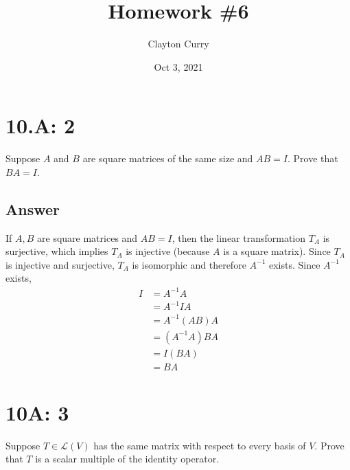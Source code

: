 \documentclass[
	12pt, %
]{fphw}
\title{Homework \#6} %
\author{Clayton Curry} %
\date{Oct 3, 2021} %
\institute{University of Oklahoma \\ Department of Mathematics} %
\newcommand\0{\mathbf{0}}
\renewcommand\L[1]{\mathcal{L}(#1)}
\begin{document}
\maketitle %


\section*{10.A: 2}
\begin{problem}
Suppose $A$ and $B$ are square matrices of the same size and $AB=I$. Prove that $BA=I$.
\end{problem}


\subsection*{Answer}
If $A,B$ are square matrices and $AB = I$, then the linear transformation $T_A$ is surjective, which implies $T_A$ is injective (because $A$ is a square matrix). Since $T_A$ is injective and surjective, $T_A$ is isomorphic and therefore $A^{-1}$ exists. Since $A^{-1}$ exists,
\begin{align*}
I &= A^{-1}A\\ 
&= A^{-1} I A\\
&= A^{-1}(AB)A\\
&=(A^{-1}A)BA\\
&=I(BA)\\
&=BA 
\end{align*}

\section*{10A: 3}
\begin{problem}
Suppose $T \in \L{V}$ has the same matrix with respect to every basis of $V$. Prove that $T$ is a scalar multiple of the identity operator.
\end{problem}

\end{document}

